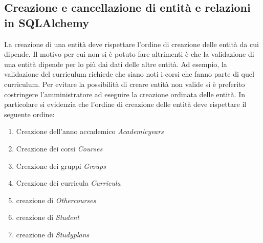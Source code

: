 \documentclass{article}
\begin{document}
\subsection{Creazione e cancellazione di entità e relazioni  in SQLAlchemy }
La creazione di una entità deve rispettare l'ordine di creazione delle entità da cui dipende. Il motivo per cui non si è potuto fare altrimenti è che la validazione di una entità dipende per lo più dai dati delle altre entità. Ad esempio, la validazione del curriculum richiede che siano noti i corsi che fanno parte di quel curriculum. Per evitare la possibilità di creare entità non valide si è preferito costringere l'amministratore ad eseguire la creazione ordinata delle entità.
In particolare si evidenzia che l'ordine di creazione delle entità deve rispettare il seguente ordine:
\begin{enumerate}
\item Creazione dell'anno accademico \emph{Academicyears}
\item Creazione dei corsi \emph{Courses}
\item Creazione dei gruppi \emph{Groups}
\item Creazione dei curricula \emph{Curricula}
\item creazione di \emph{Othercourses}
\item creazione di \emph{Student}
\item creazione di \emph{Studyplans}
\end{enumerate}
\end{document}
